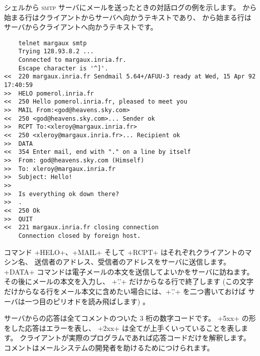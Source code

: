 \begin{example}
シェルから \textsc{smtp} サーバにメールを送ったときの対話ログの例を示します。
\ifhtmlelse{>>}{$\rightarrow$} から始まる行はクライアントからサーバへ向かうテキストであり、
\ifhtmlelse{<<}{$\leftarrow$} から始まる行はサーバからクライアントへ向かうテキストです。
{
\begin{lstlisting}
    telnet margaux smtp
    Trying 128.93.8.2 ...
    Connected to margaux.inria.fr.
    Escape character is '^]'.
<<  220 margaux.inria.fr Sendmail 5.64+/AFUU-3 ready at Wed, 15 Apr 92 17:40:59
>>  HELO pomerol.inria.fr
<<  250 Hello pomerol.inria.fr, pleased to meet you
>>  MAIL From:<god@heavens.sky.com>
<<  250 <god@heavens.sky.com>... Sender ok
>>  RCPT To:<xleroy@margaux.inria.fr>
<<  250 <xleroy@margaux.inria.fr>... Recipient ok
>>  DATA
<<  354 Enter mail, end with "." on a line by itself
>>  From: god@heavens.sky.com (Himself)
>>  To: xleroy@margaux.inria.fr
>>  Subject: Hello!
>>
>>  Is everything ok down there?
>>  .
<<  250 Ok
>>  QUIT
<<  221 margaux.inria.fr closing connection
    Connection closed by foreign host.
\end{lstlisting}}
コマンド \ml+HELO+、\ml+MAIL+ そして \ml+RCPT+ はそれぞれクライアントのマシン名、
送信者のアドレス、受信者のアドレスをサーバに送信します。
\ml+DATA+ コマンドは電子メールの本文を送信してよいかをサーバに訪ねます。
その後にメールの本文を入力し、 \ml+'.'+ だけからなる行で終了します
(この文字だけからなる行をメール本文に含めたい場合には、\ml+'.'+ を二つ書いておけば
サーバは一つ目のピリオドを読み飛ばします) 。

サーバからの応答は全てコメントのついた 3 桁の数字コードです。
\ml+5xx+ の形をした応答はエラーを表し、 \ml+2xx+ は全てが上手くいっていることを表します。
クライアントが実際のプログラムであれば応答コードだけを解釈します。
コメントはメールシステムの開発者を助けるためにつけられます。
\end{example}

